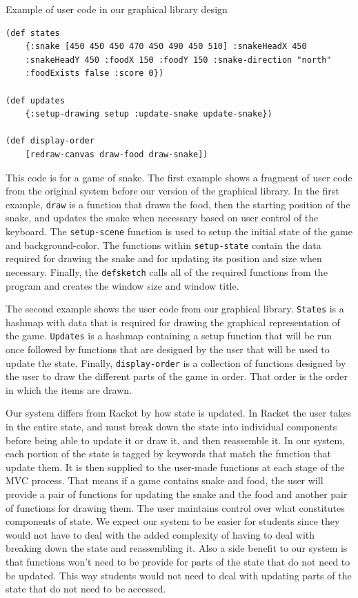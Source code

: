 \documentclass[12pt]{article}
\begin{document}
Example of user code in our graphical library design
\begin{verbatim}
(def states 
	{:snake [450 450 450 470 450 490 450 510] :snakeHeadX 450 
	:snakeHeadY 450 :foodX 150 :foodY 150 :snake-direction "north" 
	:foodExists false :score 0})
	
(def updates
	{:setup-drawing setup :update-snake update-snake})
	
(def display-order
	[redraw-canvas draw-food draw-snake])
\end{verbatim}
This code is for a game of snake. The first example shows a fragment of user code from the original system before our version of the graphical library. In the first example, \texttt{draw} is a function that draws the food, then the starting position of the snake, and updates the snake when necessary based on user control of the keyboard. The \texttt{setup-scene} function is used to setup the initial state of the game and background-color. The functions within \texttt{setup-state} contain the data required for drawing the snake and for updating its position and size when necessary. Finally, the \texttt{defsketch} calls all of the required functions from the program and creates the window size and window title. 

The second example shows the user code from our graphical library. \texttt{States} is a hashmap with data that is required for drawing the graphical representation of the game. \texttt{Updates} is a hashmap containing a setup function that will be run once followed by functions that are designed by the user that will be used to update the state. Finally, \texttt{display-order} is a collection of functions designed by the user to draw the different parts of the game in order. That order is the order in which the items are drawn.

Our system differs from Racket by how state is updated. In Racket the user takes in the entire state, and must break down the state into individual components before being able to update it or draw it, and then reassemble it. In our system, each portion of the state is tagged by keywords that match the function that update them. It is then supplied to the user-made functions at each stage of the MVC process. That means if a game contains snake and food, the user will provide a pair of functions for updating the snake and the food and another pair of functions for drawing them. The user maintains control over what constitutes components of state. We expect our system to be easier for students since they would not have to deal with the added complexity of having to deal with breaking down the state and reassembling it. Also a side benefit to our system is that functions won't need to be provide for parts of the state that do not need to be updated. This way students would not need to deal with updating parts of the state that do not need to be accessed.
\end{document}

